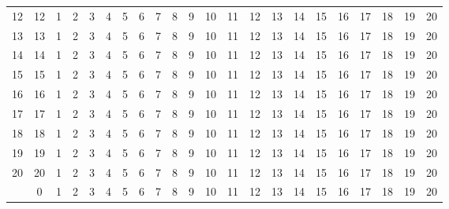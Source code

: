 \documentclass[10pt]{article}
\begin{document}
\begin{table}[ht]
\begin{tabular}{c|ccc|ccc|ccc|ccc|ccc|ccc|ccc}
    \rowcolor{LightCyan}
    12 & 12 & 1 & 2 & 3 & 4 & 5 & 6 & 7 & 8 & 9 & 10 & 11 & 12 & 13 & 14 & 15 & 16 & 17 & 18 & 19 & 20\\
    \rowcolor{LightCyan}
    13 & 13 & 1 & 2 & 3 & 4 & 5 & 6 & 7 & 8 & 9 & 10 & 11 & 12 & 13 & 14 & 15 & 16 & 17 & 18 & 19 & 20\\
    \rowcolor{LightCyan}
    14 & 14 & 1 & 2 & 3 & 4 & 5 & 6 & 7 & 8 & 9 & 10 & 11 & 12 & 13 & 14 & 15 & 16 & 17 & 18 & 19 & 20\\

    15 & 15 & 1 & 2 & 3 & 4 & 5 & 6 & 7 & 8 & 9 & 10 & 11 & 12 & 13 & 14 & 15 & 16 & 17 & 18 & 19 & 20\\
    16 & 16 & 1 & 2 & 3 & 4 & 5 & 6 & 7 & 8 & 9 & 10 & 11 & 12 & 13 & 14 & 15 & 16 & 17 & 18 & 19 & 20\\
    17 & 17 & 1 & 2 & 3 & 4 & 5 & 6 & 7 & 8 & 9 & 10 & 11 & 12 & 13 & 14 & 15 & 16 & 17 & 18 & 19 & 20\\

    \rowcolor{LightCyan}
    18 & 18 & 1 & 2 & 3 & 4 & 5 & 6 & 7 & 8 & 9 & 10 & 11 & 12 & 13 & 14 & 15 & 16 & 17 & 18 & 19 & 20\\
    \rowcolor{LightCyan}
    19 & 19 & 1 & 2 & 3 & 4 & 5 & 6 & 7 & 8 & 9 & 10 & 11 & 12 & 13 & 14 & 15 & 16 & 17 & 18 & 19 & 20\\
    \rowcolor{LightCyan}
    20 & 20 & 1 & 2 & 3 & 4 & 5 & 6 & 7 & 8 & 9 & 10 & 11 & 12 & 13 & 14 & 15 & 16 & 17 & 18 & 19 & 20\\
       & 0 & 1 & 2 & 3 & 4 & 5 & 6 & 7 & 8 & 9 & 10 & 11 & 12 & 13 & 14 & 15 & 16 & 17 & 18 & 19 & 20\\\hline

    \hline
  \end{tabular}
\end{table}
\end{document}
